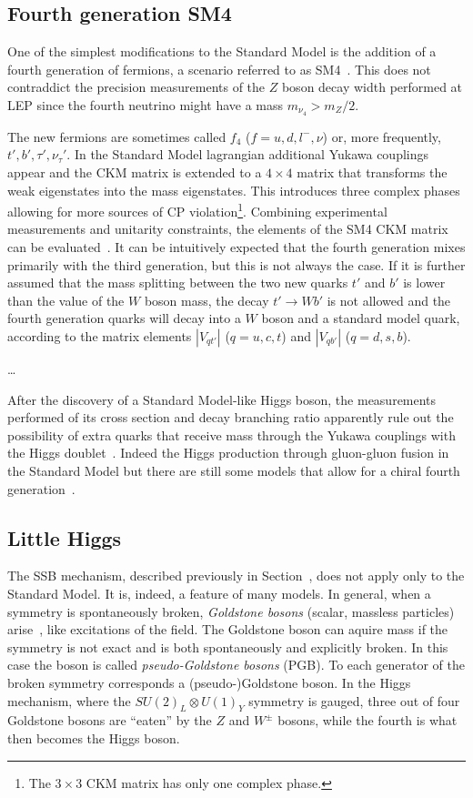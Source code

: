 \subsection{Fourth generation SM4}\label{sec:sm4}

One of the simplest modifications to the Standard Model
is the addition of a fourth generation of fermions, a
scenario referred to as SM4~\cite{Holdom:2009rf}. 
This does not contraddict the precision measurements of the $Z$
boson decay width performed at LEP since the fourth neutrino
might have a mass $m_{\nu_4}>m_{Z}/2$.

The new fermions are sometimes called $f_4$ ($f=u,d,l^{-},\nu$)
or, more frequently, $t', b', \tau', \nu_{\tau}'$. In the
Standard Model lagrangian additional Yukawa couplings appear
and the CKM matrix is extended to a $4\times 4$ matrix that
transforms the weak eigenstates into the mass eigenstates.
This introduces three complex phases allowing for more
sources of CP violation\footnote{The $3\times 3$ CKM
matrix has only one complex phase.}. Combining experimental
measurements and unitarity constraints, the elements of
the SM4 CKM matrix can be evaluated~\cite{Lacker}. It
can be intuitively expected that the fourth generation mixes
primarily with the third generation, but this is not always 
the case. If it is further
assumed that the mass splitting between the two new quarks
$t'$ and $b'$ is lower than the value of the $W$ boson mass,
the decay $t'\to Wb'$ is not allowed and the fourth generation
quarks will decay into a $W$ boson and a standard model quark,
according to the matrix elements $|V_{qt'}|$ ($q=u,c,t$) 
and $|V_{qb'}|$ ($q=d,s,b$).

\dots


After the discovery of a Standard Model-like Higgs boson,
the measurements performed of its cross section and decay 
branching ratio apparently rule out the possibility
of extra quarks that receive mass through the Yukawa couplings
with the Higgs doublet~\cite{Djouadi:2012ae}.
Indeed the Higgs production through gluon-gluon fusion
in the Standard Model 
but there are still some models that allow 
for a chiral fourth generation~\cite{Cetin:2011aa}.


\subsection{Little Higgs}\label{sec:littlehiggs}

The SSB mechanism, described previously in Section~\cite{sec:ewlagr},
does not apply only to the Standard Model. It is, indeed,
a feature of many models. In general, when a symmetry is
spontaneously broken, {\it Goldstone bosons} (scalar, massless particles)
arise~\cite{PhysRev.127.965}, like excitations of the field.
The Goldstone boson can aquire mass if the symmetry is not exact
and is both spontaneously and explicitly broken. In this case
the boson is called {\it pseudo-Goldstone bosons} (PGB).
To each generator of the broken symmetry corresponds a
(pseudo-)Goldstone boson. In the Higgs mechanism, where the
$SU(2)_L\otimes U(1)_Y$ symmetry is gauged, three out of four
Goldstone bosons are ``eaten'' by the $Z$ and $W^{\pm}$
bosons, while the fourth is what then becomes the Higgs boson.

